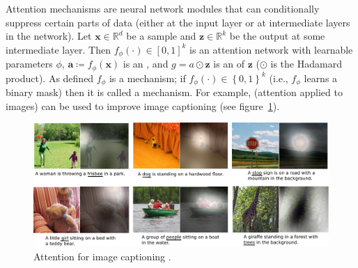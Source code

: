 Attention mechanisms \cite{bahdanau2014neural} are neural network modules that can conditionally suppress certain parts of data (either at the input layer or at intermediate layers in the network).
%
Let \(\bm{x} \in \mathbb{R}^d\) be a sample and \(\bm{z} \in \mathbb{R}^k\) be the output at some intermediate layer.
%
Then \(f_\phi(\cdot) \in \left[0,1\right]^k\) is an attention network with learnable parameters \(\phi\), \(\bm{a} \coloneqq f_\phi (\bm{x})\) is an , and \(g = a \odot \bm{z}\) is an  of \(\bm{z}\) (\(\odot\) is the Hadamard product).
%
As defined \(f_\phi\) is a  mechanism; if \(f_\phi(\cdot) \in \left\{0,1\right\}^k\) (i.e., \(f_\phi\) learns a binary mask) then it is called a  mechanism.
%
For example,  (attention applied to images) can be used to improve image captioning (see figure~\ref{fig:attention}).
\begin{figure}[!htbp]
    \centering
    \includegraphics[width=\textwidth]{figures/neural_networks/attention.png}
    \caption[]{Attention for image captioning \cite{xu2015attend}.}\label{fig:attention}
\end{figure}

